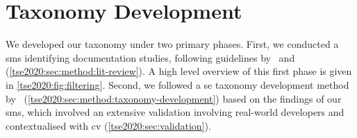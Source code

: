 %
%
%
%



\section{Taxonomy Development}
\label{tse2020:sec:method}

We developed our taxonomy under two primary phases. First, we conducted a \gls{sms} identifying  documentation studies, following guidelines by~\citet{Kitchenham:2007dd} and~\citet{Petersen:2008td} (\cref{tse2020:sec:method:lit-review}). A high level overview of this first phase is given in \cref{tse2020:fig:filtering}. Second, we followed a \gls{se} taxonomy development method by~\citet{Usman:2017hn} (\cref{tse2020:sec:method:taxonomy-development}) based on the findings of our \gls{sms}, which involved an extensive validation involving real-world developers and contextualised with \gls{cv}  (\cref{tse2020:sec:validation}).

